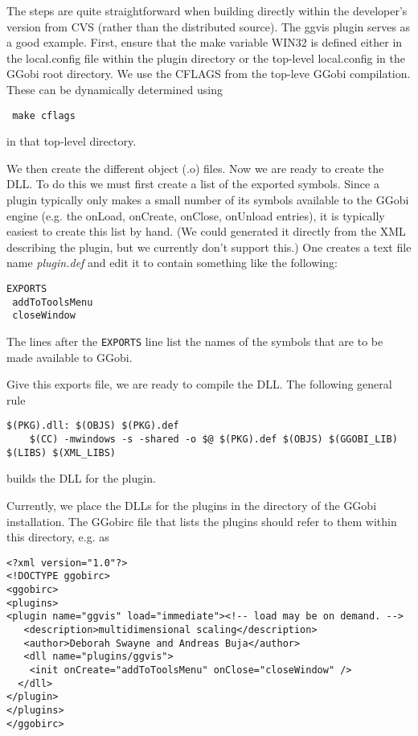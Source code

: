 \documentclass{article}
\begin{document}
The steps are quite straightforward when building directly within the
developer's version from CVS (rather than the distributed source).
The ggvis plugin serves as a good example.  First, ensure that the
make variable WIN32 is defined either in the local.config file within
the plugin directory or the top-level local.config in the GGobi root
directory.  We use the CFLAGS from the top-leve GGobi
compilation. These can be dynamically determined using
\begin{verbatim}
 make cflags
\end{verbatim}
in that top-level directory.

We then create the different object (.o) files.  Now we are ready to
create the DLL. To do this we must first create a list of the exported
symbols. Since a plugin typically only makes a small number of its
symbols available to the GGobi engine (e.g. the onLoad, onCreate,
onClose, onUnload entries), it is typically easiest to create this
list by hand. (We could generated it directly from the XML describing
the plugin, but we currently don't support this.)
One creates a text file name \textit{plugin.def}
and edit it to contain something like the following:
\begin{verbatim}
EXPORTS
 addToToolsMenu
 closeWindow
\end{verbatim}
The lines after the \verb+EXPORTS+ line 
list the names of the symbols that are to be made available
to GGobi.

Give this exports file, we are ready to compile the DLL.
The following general rule 
\begin{verbatim}
$(PKG).dll: $(OBJS) $(PKG).def
	$(CC) -mwindows -s -shared -o $@ $(PKG).def $(OBJS) $(GGOBI_LIB) $(LIBS) $(XML_LIBS) 
\end{verbatim}
builds the DLL for the plugin.

Currently, we place the DLLs for the plugins in the 
 directory of the GGobi installation.
The GGobirc file that lists the plugins should refer
to them within this directory, e.g. as
\begin{verbatim}
<?xml version="1.0"?>
<!DOCTYPE ggobirc>
<ggobirc>
<plugins>
<plugin name="ggvis" load="immediate"><!-- load may be on demand. -->
   <description>multidimensional scaling</description>
   <author>Deborah Swayne and Andreas Buja</author>
   <dll name="plugins/ggvis">
    <init onCreate="addToToolsMenu" onClose="closeWindow" />
  </dll>
</plugin>
</plugins>
</ggobirc>
\end{verbatim}



\begin{comment}
\section{Issues}
Configuration

Debugging dynamically loaded code.

The plugin mechanism requires XML.
\end{comment}
\end{document}
